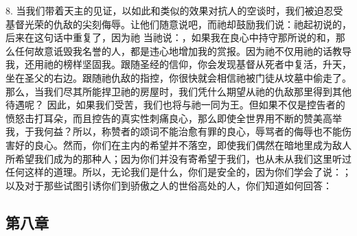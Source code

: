 8. 当我们带着天主的见证，以如此和类似的效果对抗人的空谈时，我们被迫忍受基督光荣的仇敌的尖刻侮辱。让他们随意说吧，而祂却鼓励我们说：祂起初说的，后来在这句话中重复了，因为祂 当祂说：，如果我在良心中持守那所说的和，那么任何故意诋毁我名誉的人，都是违心地增加我的赏报。因为祂不仅用祂的话教导我，还用祂的榜样坚固我。跟随圣经的信仰，你会发现基督从死者中复活，升天，坐在圣父的右边。跟随祂仇敌的指控，你很快就会相信祂被门徒从坟墓中偷走了。那么，当我们尽其所能捍卫祂的房屋时，我们凭什么期望从祂的仇敌那里得到其他待遇呢？ 因此，如果我们受苦，我们也将与祂一同为王。但如果不仅是控告者的愤怒击打耳朵，而且控告的真实性刺痛良心，那么即使全世界用不断的赞美高举我，于我何益？所以，称赞者的颂词不能治愈有罪的良心，辱骂者的侮辱也不能伤害好的良心。然而，你们在主内的希望并不落空，即使我们偶然在暗地里成为敌人所希望我们成为的那种人；因为你们并没有寄希望于我们，也从未从我们这里听过任何这样的道理。所以，无论我们是什么，你们是安全的，因为你们学会了说：；以及对于那些试图引诱你们到骄傲之人的世俗高处的人，你们知道如何回答：\par


\subsection{第八章}

